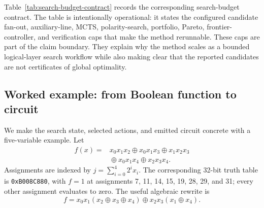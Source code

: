 \documentclass[11pt]{article}
\newcommand{\method}{Resource-NMCTS}
\newcommand{\xor}{\ensuremath{\oplus}}
\begin{document}
\begin{table}[H]
\centering
\scriptsize
\setlength{\tabcolsep}{2pt}
\renewcommand{\arraystretch}{1.05}
\caption{Algorithm contract for \method{}.  The table converts the method
description into implementation-anchored operational rules and reviewer-facing
guarantees.}
\label{tab:algorithm-contract}

\end{table}

Table~\ref{tab:search-budget-contract} records the corresponding search-budget
contract.  The table is intentionally operational: it states the configured
candidate fan-out, auxiliary-line, MCTS, polarity-search, portfolio, Pareto,
frontier-controller, and verification caps that make the method rerunnable.
These caps are part of the claim boundary.  They explain why the method scales
as a bounded logical-layer search workflow while also making clear that the
reported candidates are not certificates of global optimality.

\begin{table}[H]
\centering
\scriptsize
\setlength{\tabcolsep}{2pt}
\renewcommand{\arraystretch}{1.05}
\caption{Search-budget contract for \method{}.  Each row states the explicit
cap used to make the search rerunnable, the scalability role of that cap, and
the limitation it leaves in place.}
\label{tab:search-budget-contract}

\end{table}

\subsection{Worked example: from Boolean function to circuit}
\label{sec:worked-example}

We make the search state, selected actions, and emitted circuit concrete with a
five-variable example.  Let
\begin{equation}
\begin{split}
f(x)={}&x_0x_1x_2\xor x_0x_1x_3\xor x_1x_2x_3\\
      &{}\xor x_0x_1x_4\xor x_2x_3x_4 .
\end{split}
\label{eq:worked-example-anf}
\end{equation}
Assignments are indexed by
$j=\sum_{i=0}^{4}2^i x_i$.  The corresponding 32-bit truth table is
\texttt{0xB008C880}, with $f=1$ at assignments 7, 11, 14, 15, 19, 28, 29,
and 31; every other assignment evaluates to zero.
The useful algebraic rewrite is
\begin{equation}
f=x_0x_1(x_2\xor x_3\xor x_4)
  \xor x_2x_3(x_1\xor x_4).
\label{eq:worked-example-factor}
\end{equation}
\end{document}
